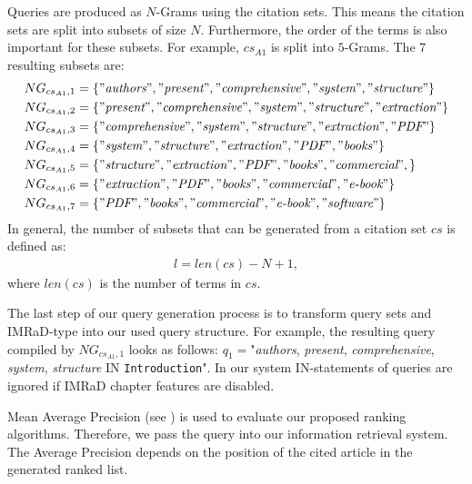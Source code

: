 Queries are produced as $N$-Grams using the citation sets. This means the citation sets are split into subsets of size $N$. Furthermore, the order of the terms is also important for these subsets. For example, $cs_{A1}$ is split into $5$-Grams. The $7$ resulting subsets are:
\begin{align*}
  NG_{cs_{A1}, 1} &= \{"\textit{authors}", "\textit{present}", "\textit{comprehensive}", "\textit{system}", "\textit{structure}"\} \nonumber \\
  NG_{cs_{A1}, 2} &= \{"\textit{present}", "\textit{comprehensive}", "\textit{system}", "\textit{structure}", "\textit{extraction}"\} \nonumber \\
  NG_{cs_{A1}, 3} &= \{"\textit{comprehensive}", "\textit{system}", "\textit{structure}", "\textit{extraction}", "\textit{PDF}"\} \nonumber \\
  NG_{cs_{A1}, 4} &= \{"\textit{system}", "\textit{structure}", "\textit{extraction}", "\textit{PDF}", "\textit{books}"\} \nonumber \\
  NG_{cs_{A1}, 5} &= \{"\textit{structure}", "\textit{extraction}", "\textit{PDF}", "\textit{books}", "\textit{commercial}",\} \nonumber \\
  NG_{cs_{A1}, 6} &= \{"\textit{extraction}", "\textit{PDF}", "\textit{books}", "\textit{commercial}", "\textit{e-book}"\} \nonumber \\
  NG_{cs_{A1}, 7} &= \{"\textit{PDF}", "\textit{books}", "\textit{commercial}", "\textit{e-book}", "\textit{software}"\} \nonumber \\
\end{align*}
In general, the number of subsets that can be generated from a citation set $cs$ is defined as:
\begin{align}
  l = len(cs) - N + 1,
\end{align}
where $len(cs)$ is the number of terms in $cs$. 

The last step of our query generation process is to transform query sets and IMRaD-type into our used query structure. For example, the resulting query compiled by $NG_{cs_{A1}, 1}$ looks as follows: $q_1=$"\textit{authors}, \textit{present}, \textit{comprehensive}, \textit{system}, \textit{structure} IN \texttt{Introduction}". In our system IN-statements of queries are ignored if IMRaD chapter features are disabled.

Mean Average Precision (see ) is used to evaluate our proposed ranking algorithms. Therefore, we pass the query into our information retrieval system. The Average Precision depends on the position of the cited article in the generated ranked list.

